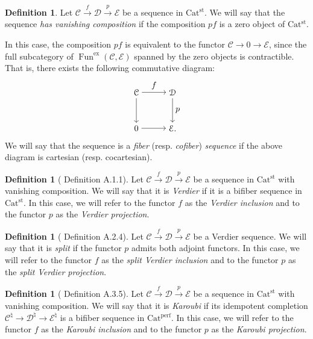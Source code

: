\documentclass[a4paper,dvipdfmx,11pt,reqno]{amsart}
\DeclareMathOperator{\Fun}{Fun}
\newcommand{\C}{\mathcal{C}}
\newcommand{\D}{\mathcal{D}}
\newcommand{\E}{\mathcal{E}}
\newcommand{\Catperf}{\mathrm{Cat^{perf}}}
\newcommand{\Catst}{\mathrm{Cat^{st}}}
\theoremstyle{definition}
\newtheorem{definition}[theorem]{Definition}
\begin{document}
\begin{definition} \label{CDH23.rem.A.1.2}
  Let $\C \xrightarrow{f} \D \xrightarrow{p} \E$ be a sequence in $\Catst$.
  We will say that the sequence \textit{has vanishing composition} if the composition $pf$ is a zero object of $\Catst$.
  
  In this case, the composition $pf$ is equivalent to the functor $\C \to 0 \to \E$, since the full subcategory of $\Fun^{\mathrm{ex}}(\C,\E)$ spanned by the zero objects is contractible.
  That is, there exists the following commutative diagram:
  \[\begin{tikzpicture}[auto,->] 
    \node (tl) at (0,1.5) {$\C$}; 
    \node (tr) at (1.5,1.5) {$\D$};
    \node (bl) at (0,0) {$0$}; 
    \node (br) at (1.5,0) {$\E.$}; 
    \draw (tl) -- node {$f$} (tr); 
    \draw (bl) -- node[swap] {} (br); 
    \draw (tl) -- node[swap] {} (bl);
    \draw (tr) -- node {$p$} (br); 
  \end{tikzpicture}\]
  We will say that the sequence is a \textit{fiber} (resp. \textit{cofiber}) \textit{sequence} if the above diagram is cartesian (resp. cocartesian).
\end{definition}

\begin{definition}[\cite{CDH23} Definition A.1.1] \label{CDH23.def.A.1.1}
  Let $\C \xrightarrow{f} \D \xrightarrow{p} \E$ be a sequence in $\Catst$ with vanishing composition.
  We will say that it is \textit{Verdier} if it is a bifiber sequence in $\Catst$.
  In this case, we will refer to the functor $f$ as the \textit{Verdier inclusion} and to the functor $p$ as the \textit{Verdier projection}.
\end{definition}

\begin{definition}[\cite{CDH23} Definition A.2.4] \label{CDH23.def.A.2.4}
  Let $\C \xrightarrow{f} \D \xrightarrow{p} \E$ be a Verdier sequence.
  We will say that it is \textit{split} if the functor $p$ admits both adjoint functors.
  In this case, we will refer to the functor $f$ as the \textit{split Verdier inclusion} and to the functor $p$ as the \textit{split Verdier projection}.
\end{definition}

\begin{definition}[\cite{CDH23} Definition A.3.5] \label{CDH23.def.A.3.5}
  Let $\C \xrightarrow{f} \D \xrightarrow{p} \E$ be a sequence in $\Catst$ with vanishing composition.
  We will say that it is \textit{Karoubi} if its idempotent completion $\C^{\natural} \to \D^{\natural} \to \E^{\natural}$ is a bifiber sequence in $\Catperf$.
  In this case, we will refer to the functor $f$ as the \textit{Karoubi inclusion} and to the functor $p$ as the \textit{Karoubi projection}.
\end{definition}
\end{document}
